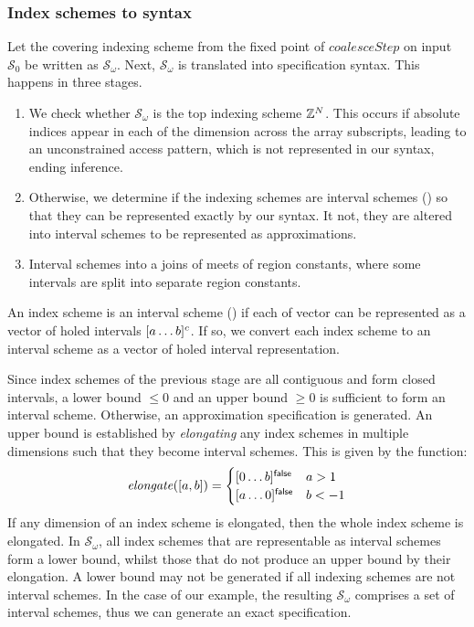 \subsubsection{Index schemes to syntax}

\newcommand{\finalSet}{\mathcal{S}_\omega}
Let the covering indexing scheme from the fixed point of
$\mathit{coalesceStep}$ on input $\mathcal{S}_0$ be written as
$\finalSet{}$.  Next, $\finalSet{}$ is translated into specification
syntax. This happens in three stages.

\begin{enumerate}[leftmargin=2em]
  \item We check whether $\finalSet{}$
  is the top indexing scheme $\textnormal{$\mathbb{Z}$}{}^N$. This occurs if absolute indices
  appear in each of the dimension across the array subscripts,
  leading to an unconstrained access pattern, which is not represented
  in our syntax, ending inference.

  \item Otherwise, we determine if the indexing schemes are interval
  schemes () so that they can be represented
  exactly by our syntax. It not, they are altered into interval
  schemes to be represented as approximations.

  \item Interval schemes into a joins of meets
  of region constants, where some intervals are split into separate
  region constants.
\end{enumerate}
%
An index scheme is an interval scheme () if
each of vector can be represented as a vector of holed intervals
$\textnormal{$\lbrack a\dots b\rbrack^{c}$}$.  If so, we convert each index scheme to an
interval scheme as a vector of holed interval representation.

Since index schemes of the previous stage are all contiguous and form
closed intervals, a lower bound $\leq 0$ and an upper bound $\geq 0$
is sufficient to form an interval scheme.  Otherwise, an approximation
specification is generated. An upper bound is established by
\emph{elongating} any index schemes in multiple dimensions such that
they become interval schemes. This is given by the function:
%
\begin{align*}
  \mathit{elongate}([a,b]) = \begin{cases}
    \textnormal{$\lbrack0\dots b\rbrack^{\textsf{false}}$} & a > 1 \\
    \textnormal{$\lbrack a\dots0\rbrack^{\textsf{false}}$} & b < -1
  \end{cases}
\end{align*}
%
If any dimension of an index scheme is elongated, then the whole index
scheme is elongated. In $\finalSet$, all index schemes that are
representable as interval schemes form a lower bound, whilst those
that do not produce an upper bound by their elongation. A lower bound
may not be generated if all indexing schemes are not interval schemes.
In the case of our example, the resulting $\finalSet$ comprises a set
of interval schemes, thus we can generate an exact specification.

